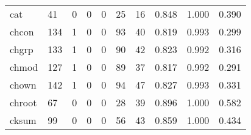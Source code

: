 \begin{longtable}{lp{2.0cm}p{2.0cm}p{2.0cm}p{2.0cm}p{2.0cm}p{2.0cm}p{2.0cm}p{2.0cm}p{2.0cm}}
cat       &                     41 &                                             0 &                                            0 &                                           0 &                                           25 &                                         16 &                                0.848 &                                  1.000 &                                0.390 \\
chcon     &                    134 &                                             1 &                                            0 &                                           0 &                                           93 &                                         40 &                                0.819 &                                  0.993 &                                0.299 \\
chgrp     &                    133 &                                             1 &                                            0 &                                           0 &                                           90 &                                         42 &                                0.823 &                                  0.992 &                                0.316 \\
chmod     &                    127 &                                             1 &                                            0 &                                           0 &                                           89 &                                         37 &                                0.817 &                                  0.992 &                                0.291 \\
chown     &                    142 &                                             1 &                                            0 &                                           0 &                                           94 &                                         47 &                                0.827 &                                  0.993 &                                0.331 \\
chroot    &                     67 &                                             0 &                                            0 &                                           0 &                                           28 &                                         39 &                                0.896 &                                  1.000 &                                0.582 \\
cksum     &                     99 &                                             0 &                                            0 &                                           0 &                                           56 &                                         43 &                                0.859 &                                  1.000 &                                0.434 \\

\end{longtable}
